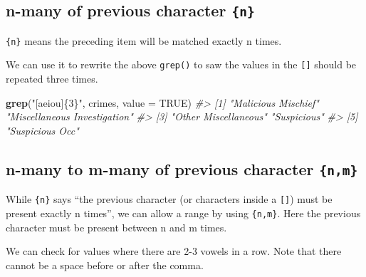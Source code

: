 \documentclass[
  12pt,
]{book}
\newenvironment{Shaded}{\begin{snugshade}}{\end{snugshade}}
\newcommand{\CommentTok}[1]{\textcolor[rgb]{0.37,0.37,0.37}{\textit{#1}}}
\newcommand{\DataTypeTok}[1]{\textcolor[rgb]{0.27,0.27,0.27}{#1}}
\newcommand{\KeywordTok}[1]{\textcolor[rgb]{0.27,0.27,0.27}{\textbf{#1}}}
\newcommand{\NormalTok}[1]{#1}
\newcommand{\OtherTok}[1]{\textcolor[rgb]{0.37,0.37,0.37}{#1}}
\newcommand{\StringTok}[1]{\textcolor[rgb]{0.5,0.5,0.5}{#1}}
\begin{document}
\hypertarget{n-many-of-previous-character-n}{%
\subsection{\texorpdfstring{n-many of previous character \texttt{\{n\}}}{n-many of previous character \{n\}}}\label{n-many-of-previous-character-n}}

\texttt{\{n\}} means the preceding item will be matched exactly n times.

We can use it to rewrite the above \texttt{grep()} to saw the values in the \texttt{{[}{]}} should be repeated three times.

\begin{Shaded}
\begin{Highlighting}[]
\KeywordTok{grep}\NormalTok{(}\StringTok{"[aeiou]\{3\}"}\NormalTok{, crimes, }\DataTypeTok{value =} \OtherTok{TRUE}\NormalTok{)}
\CommentTok{\#> [1] "Malicious Mischief"          "Miscellaneous Investigation"}
\CommentTok{\#> [3] "Other Miscellaneous"         "Suspicious"                 }
\CommentTok{\#> [5] "Suspicious Occ"}
\end{Highlighting}
\end{Shaded}

\hypertarget{n-many-to-m-many-of-previous-character-nm}{%
\subsection{\texorpdfstring{n-many to m-many of previous character \texttt{\{n,m\}}}{n-many to m-many of previous character \{n,m\}}}\label{n-many-to-m-many-of-previous-character-nm}}

While \texttt{\{n\}} says ``the previous character (or characters inside a \texttt{{[}{]}}) must be present exactly n times'', we can allow a range by using \texttt{\{n,m\}}. Here the previous character must be present between n and m times.

We can check for values where there are 2-3 vowels in a row. Note that there cannot be a space before or after the comma.
\end{document}
